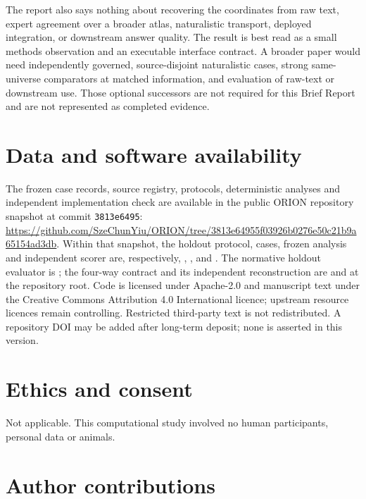 The report also says nothing about recovering the coordinates from raw text,
expert agreement over a broader atlas, naturalistic transport, deployed
integration, or downstream answer quality. The result is best read as a small
methods observation and an executable interface contract. A broader paper would
need independently governed, source-disjoint naturalistic cases, strong
same-universe comparators at matched information, and evaluation of raw-text or
downstream use. Those optional successors are not required for this Brief
Report and are not represented as completed evidence.

\section{Data and software availability}

The frozen case records, source registry, protocols, deterministic analyses and
independent implementation check are available in the public ORION repository
snapshot at commit \texttt{3813e6495}:
\url{https://github.com/SzeChunYiu/ORION/tree/3813e64955f03926b0276e50c21b9a65154ad3db}.
Within that snapshot, the holdout protocol, cases, frozen analysis and
independent scorer are, respectively,
,
,
and . The normative holdout
evaluator is ; the four-way contract and
its independent reconstruction are
 and
 at the repository
root. Code is licensed under
Apache-2.0 and manuscript text under the Creative Commons Attribution 4.0
International licence; upstream resource licences remain controlling.
Restricted third-party text is not redistributed. A repository DOI may be
added after long-term deposit; none is asserted in this version.

\section*{Ethics and consent}

Not applicable. This computational study involved no human participants,
personal data or animals.

\section*{Author contributions}


